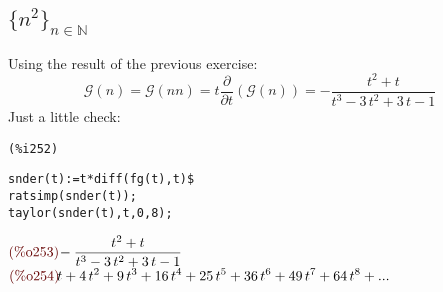 \subsection{$\{n^2\}_{n\in \mathbb{N} }$}
Using the result of the previous exercise:
\begin{displaymath}
  \mathcal{G} (n) = \mathcal{G} (n n) = t
  \frac{\partial}{\partial t}\left( \mathcal{G} (n) \right) = 
  -\frac{{t}^{2}+t}{{t}^{3}-3\,{t}^{2}+3\,t-1}
\end{displaymath}
Just a little check:\\
\noindent
\begin{minipage}[t]{8ex}{\color{red}\bf
\begin{verbatim}
(%i252) 
\end{verbatim}}
\end{minipage}
\begin{minipage}[t]{\textwidth}{\color{blue}
\begin{verbatim}
snder(t):=t*diff(fg(t),t)$
ratsimp(snder(t));
taylor(snder(t),t,0,8);
\end{verbatim}}
\end{minipage}
\begin{math}\displaystyle
\parbox{8ex}{\color{labelcolor}(\%o253) }
-\frac{{t}^{2}+t}{{t}^{3}-3\,{t}^{2}+3\,t-1}
\end{math}\\
\begin{math}\displaystyle
\parbox{8ex}{\color{labelcolor}(\%o254) }
t+4\,{t}^{2}+9\,{t}^{3}+16\,{t}^{4}+25\,{t}^{5}+36\,{t}^{6}+49\,{t}^{7}+64\,{t}^{8}+...
\end{math}
